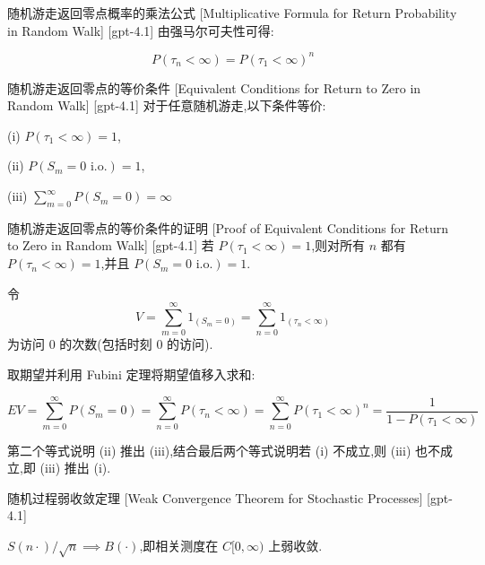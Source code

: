 \documentclass[UTF8]{ctexart}
\begin{document}
    \begin{thm}
        {随机游走返回零点概率的乘法公式}
        [Multiplicative Formula for Return Probability in Random Walk]
        [gpt-4.1]
        由强马尔可夫性可得:

\[
P(\tau_n < \infty) = P(\tau_1 < \infty)^n
\]

    \end{thm}
    
    
    
    \begin{thm}
        {随机游走返回零点的等价条件}
        [Equivalent Conditions for Return to Zero in Random Walk]
        [gpt-4.1]
        对于任意随机游走,以下条件等价:

(i) $P(\tau_1 < \infty) = 1$,

(ii) $P(S_m = 0 \text{ i.o.}) = 1$,

(iii) $\sum_{m=0}^{\infty} P(S_m = 0) = \infty$

    \end{thm}
    
    
    
    \begin{prf}
        {随机游走返回零点的等价条件的证明}
        [Proof of Equivalent Conditions for Return to Zero in Random Walk]
        [gpt-4.1]
        若 $P(\tau_1 < \infty) = 1$,则对所有 $n$ 都有 $P(\tau_n < \infty) = 1$,并且 $P(S_m = 0 \text{ i.o.}) = 1$.

令
\[
V = \sum_{m=0}^{\infty} 1_{(S_m = 0)} = \sum_{n=0}^{\infty} 1_{(\tau_n < \infty)}
\]
为访问 0 的次数(包括时刻 0 的访问).

取期望并利用 Fubini 定理将期望值移入求和:

\[
E V = \sum_{m=0}^{\infty} P(S_m = 0) = \sum_{n=0}^{\infty} P(\tau_n < \infty) = \sum_{n=0}^{\infty} P(\tau_1 < \infty)^n = \frac{1}{1 - P(\tau_1 < \infty)}
\]

第二个等式说明 (ii) 推出 (iii),结合最后两个等式说明若 (i) 不成立,则 (iii) 也不成立,即 (iii) 推出 (i).

    \end{prf}
    
    
    
    \begin{thm}
        {随机过程弱收敛定理}
        [Weak Convergence Theorem for Stochastic Processes]
        [gpt-4.1]
        
$S(n \cdot ) / \sqrt{ n } \implies B(\cdot)$,即相关测度在 $C[0, \infty )$ 上弱收敛.

    \end{thm}
    
\end{document}
